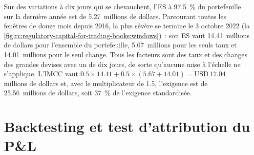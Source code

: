 \begin{example}\label{ex:rc:regulatory-capital-for-trading-books:ima}
Sur des variations à dix jours qui se chevauchent, l'ES à 97.5~\% du portefeuille sur la dernière année est de 5.27~millions de dollars. Parcourant
toutes les fenêtres de douze mois depuis 2016, la plus sévère se termine le 3 octobre 2022
(la \cref{fig:rc:regulatory-capital-for-trading-books:windows})~: son ES vaut 14.41~millions de dollars pour l'ensemble du portefeuille,
5.67~millions pour les seuls taux et 14.01~millions pour le seul change. Tous les facteurs sont des taux et des changes des grandes devises
avec un  de dix jours, de sorte qu'aucune mise à l'échelle ne s'applique. L'IMCC vaut
$0.5\times14.41+0.5\times(5.67+14.01) = \text{USD}~17.04$ millions de dollars et, avec le multiplicateur de 1.5, l'exigence
est de 25.56~millions de dollars, soit 37~\% de l'exigence standardisée.
\end{example}

\begin{omfigure}

\label{fig:rc:regulatory-capital-for-trading-books:windows}
\end{omfigure}

\section{Backtesting et test d'attribution du P\&L}

